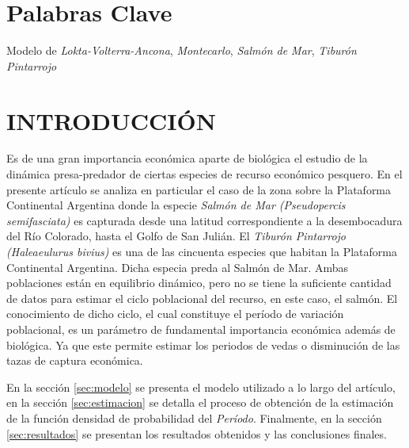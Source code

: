 \documentclass{SPANISH_acm_proc_article-sp}
\begin{document}
\section*{Palabras Clave}
Modelo de \textit{Lokta-Volterra-Ancona}, \textit{Montecarlo}, \textit{Salm\'on de Mar},
\textit{Tibur\'on Pintarrojo}

\section{INTRODUCCI\'ON}
Es de una gran importancia econ\'omica aparte de biol\'ogica el estudio de la din\'amica
presa-predador de ciertas especies de recurso econ\'omico pesquero. En el presente art\'iculo
se analiza en particular el caso de la zona sobre la Plataforma Continental Argentina donde
la especie \emph{Salm\'on de Mar (Pseudopercis semifasciata)} es capturada desde una
latitud correspondiente a la desembocadura del R\'io Colorado, hasta el Golfo de San Juli\'an.
El \emph{Tibur\'on Pintarrojo (Haleaeulurus bivius)} es una de las cincuenta especies que
habitan la Plataforma Continental Argentina. Dicha especia preda al Salm\'on de Mar.
Ambas poblaciones est\'an en equilibrio din\'amico, pero no se tiene la suficiente 
cantidad de datos para estimar el ciclo poblacional del recurso, en este caso, el salm\'on.
El conocimiento de dicho ciclo, el cual constituye el per\'iodo de variaci\'on poblacional,
es un par\'ametro de fundamental importancia econ\'omica adem\'as de biol\'ogica. Ya que
este permite estimar los periodos de vedas o disminuci\'on de las tazas de captura
econ\'omica.

En la secci\'on \ref{sec:modelo} se presenta el modelo utilizado a lo largo del art\'iculo,
en la secci\'on \ref{sec:estimacion} se detalla el proceso de obtenci\'on de la
estimaci\'on de la funci\'on densidad de probabilidad del \emph{Per\'iodo}. Finalmente,
en la secci\'on \ref{sec:resultados} se presentan los resultados obtenidos y las
conclusiones finales.
\end{document}
